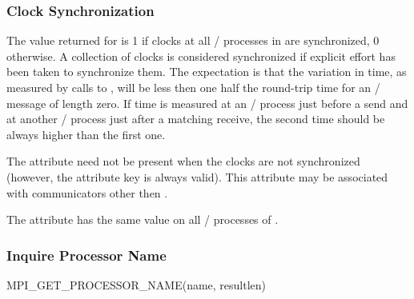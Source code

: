 \subsubsection{Clock Synchronization}
\label{subsubsec:inquiry-clock-sync}

The value returned for  is 1 if clocks
at all \mpi/ processes in\flushline %
 are synchronized, 0
otherwise.  A collection of clocks is considered synchronized if
explicit effort has been taken to synchronize them.  The
expectation is that the variation in time, as measured by calls
to , will be less then one half the round-trip
time for an \MPI/ message of length zero.  If time is measured at an \mpi/
process just before a send and at another \mpi/ process just after a matching
receive, the second time should be always higher than the first one.

The attribute  need not be present when
the clocks are not synchronized (however, the attribute key
 is always valid).
This attribute
may be associated with communicators other then .

The attribute  has the same value on all
\mpi/ processes of .

\subsubsection{Inquire Processor Name}
\begin{funcdef}{MPI\_GET\_PROCESSOR\_NAME}{(\mbox{name}, \mbox{resultlen})}
\end{funcdef}

